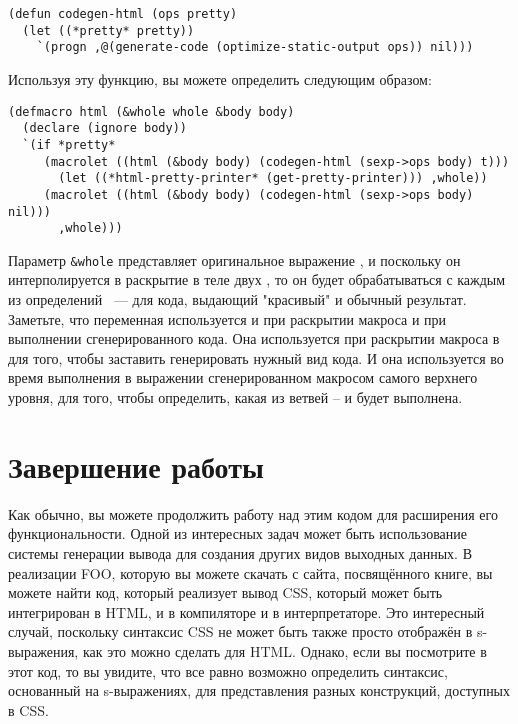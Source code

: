 \begin{lstlisting}
(defun codegen-html (ops pretty)
  (let ((*pretty* pretty))
    `(progn ,@(generate-code (optimize-static-output ops)) nil)))
\end{lstlisting}

Используя эту функцию, вы можете определить  следующим образом:

\begin{lstlisting}
(defmacro html (&whole whole &body body)
  (declare (ignore body))
  `(if *pretty*
     (macrolet ((html (&body body) (codegen-html (sexp->ops body) t)))
       (let ((*html-pretty-printer* (get-pretty-printer))) ,whole))
     (macrolet ((html (&body body) (codegen-html (sexp->ops body) nil)))
       ,whole)))
\end{lstlisting}

Параметр \lstinline!&whole! представляет оригинальное выражение , и поскольку
он интерполируется в раскрытие в теле двух , то он будет обрабатываться с
каждым из определений ~--- для кода, выдающий "красивый" и обычный результат.
Заметьте, что переменная  используется и при раскрытии макроса и при
выполнении сгенерированного кода.  Она используется при раскрытии макроса в
 для того, чтобы заставить  генерировать нужный вид
кода.  И она используется во время выполнения в выражении  сгенерированном
макросом  самого верхнего уровня, для того, чтобы определить, какая из ветвей
--  и  будет выполнена.

\section{Завершение работы}

Как обычно, вы можете продолжить работу над этим кодом для расширения его
функциональности.  Одной из интересных задач может быть использование системы генерации
вывода для создания других видов выходных данных.  В реализации FOO, которую вы можете
скачать с сайта, посвящённого книге, вы можете найти код, который реализует вывод CSS,
который может быть интегрирован в HTML, и в компиляторе и в интерпретаторе.  Это
интересный случай, поскольку синтаксис CSS не может быть также просто отображён в
s-выражения, как это можно сделать для HTML.  Однако, если вы посмотрите в этот код, то вы
увидите, что все равно возможно определить синтаксис, основанный на s-выражениях, для
представления разных конструкций, доступных в CSS.

